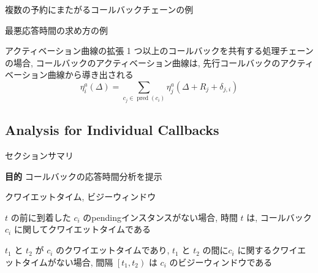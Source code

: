 \begin{frame}{複数の予約にまたがるコールバックチェーンの例}
\end{frame}

\begin{frame}{最悪応答時間の求め方の例}
\end{frame}

\begin{frame}{アクティベーション曲線の拡張}
    1 つ以上のコールバックを共有する処理チェーンの場合, コールバックのアクティベーション曲線は, 先行コールバックのアクティベーション曲線から導き出される
    \begin{equation*}
        \eta_{i}^{a}(\Delta)=\sum_{c_{j} \in \operatorname{pred}\left(c_{i}\right)} \eta_{j}^{a}\left(\Delta+R_{j}+\delta_{j, i}\right)
    \end{equation*}
\end{frame}


\subsection{Analysis for Individual Callbacks}
\label{ssec: analysis for individual callbacks}

\begin{frame}{セクションサマリ}
    \begin{itembox}[l]{\textbf{目的}}
        コールバックの応答時間分析を提示
    \end{itembox}
\end{frame}

\begin{frame}{クワイエットタイム, ビジーウィンドウ}
    \begin{definition}[クワイエットタイム]
        $t$ の前に到着した $c_{i}$ のpendingインスタンスがない場合, 時間 $t$ は, コールバック $c_{i}$ に関してクワイエットタイムである
    \end{definition}
    \begin{definition}[ビジーウィンドウ]
        $t_{1}$ と $t_{2}$ が $c_{i}$ のクワイエットタイムであり, $t_{1}$ と $t_{2}$ の間に$c_{i}$ に関するクワイエットタイムがない場合, 間隔 $\left[t_{1}, t_{2}\right)$ は $c_{i}$ のビジーウィンドウである
    \end{definition}
\end{frame}

